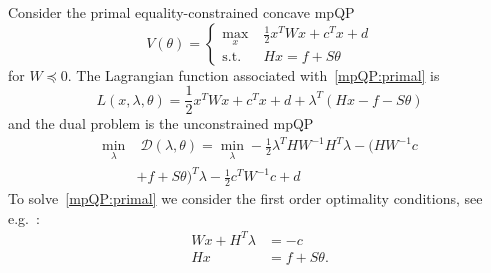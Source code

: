 \documentclass{ifacconf}
\begin{document}
Consider the primal equality-constrained concave mpQP
\begin{equation}\label{mpQP:primal}
	V(\theta) = \left\{\begin{split}
	\max_x & \;\frac{1}{2} x^T W x + c^Tx + d\\
	\text{s.t.} &\; Hx  = f +S\theta
	\end{split}\right.
\end{equation}
for $W\preceq 0.$ The Lagrangian function associated with~\eqref{mpQP:primal} is
\begin{equation}
	L(x,\lambda,\theta)  = \frac{1}{2} x^T W x + c^Tx + d + \lambda^T(Hx - f - S\theta)
\end{equation}
and the dual problem is the unconstrained mpQP
\begin{equation}\label{mpQP:dual}\begin{split}
	\min_\lambda &\; \mathcal D(\lambda,\theta)= \min_\lambda-\frac{1}{2}\lambda^T H W^{-1}H^T \lambda 
	-(HW^{-1}c\\ &+ f + S\theta)^T\lambda
	-\frac{1}{2}c^TW^{-1}c +d
\end{split}\end{equation}
To solve~\eqref{mpQP:primal} we consider the first order optimality conditions, see e.g.~\cite{Fletcher:2000}:
\begin{equation}\label{kkt:conditions}
	\begin{aligned}
        W x + H^T\lambda & = -c \\
        H x &= f + S\theta.
	\end{aligned}
\end{equation}
\end{document}
